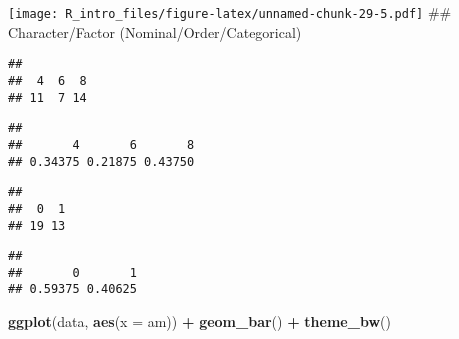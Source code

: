 \documentclass[
  a4paper,
]{article}
\newenvironment{Shaded}{\begin{snugshade}}{\end{snugshade}}
\newcommand{\AttributeTok}[1]{\textcolor[rgb]{0.13,0.29,0.53}{#1}}
\newcommand{\FunctionTok}[1]{\textcolor[rgb]{0.13,0.29,0.53}{\textbf{#1}}}
\newcommand{\NormalTok}[1]{#1}
\newcommand{\SpecialCharTok}[1]{\textcolor[rgb]{0.81,0.36,0.00}{\textbf{#1}}}
\begin{document}
\texttt{[image: R\_intro\_files/figure-latex/unnamed-chunk-29-5.pdf]} \#\#
Character/Factor (Nominal/Order/Categorical)

\begin{Shaded}
\end{Shaded}

\begin{verbatim}
## 
##  4  6  8 
## 11  7 14
\end{verbatim}

\begin{Shaded}
\end{Shaded}

\begin{verbatim}
## 
##       4       6       8 
## 0.34375 0.21875 0.43750
\end{verbatim}

\begin{Shaded}
\end{Shaded}

\begin{verbatim}
## 
##  0  1 
## 19 13
\end{verbatim}

\begin{Shaded}
\end{Shaded}

\begin{verbatim}
## 
##       0       1 
## 0.59375 0.40625
\end{verbatim}

\begin{Shaded}
\begin{Highlighting}[]
\FunctionTok{ggplot}\NormalTok{(data, }\FunctionTok{aes}\NormalTok{(}\AttributeTok{x =}\NormalTok{ am)) }\SpecialCharTok{+} \FunctionTok{geom\_bar}\NormalTok{() }\SpecialCharTok{+} \FunctionTok{theme\_bw}\NormalTok{()}
\end{Highlighting}
\end{Shaded}
\end{document}
